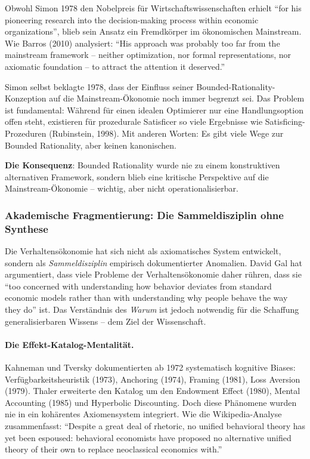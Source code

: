 Obwohl Simon 1978 den Nobelpreis für Wirtschaftswissenschaften erhielt ``for his pioneering research into the decision-making process within economic organizations'', blieb sein Ansatz ein Fremdkörper im ökonomischen Mainstream. Wie Barros (2010) analysiert: ``His approach was probably too far from the mainstream framework -- neither optimization, nor formal representations, nor axiomatic foundation -- to attract the attention it deserved.''

Simon selbst beklagte 1978, dass der Einfluss seiner Bounded-Rationality-Konzeption auf die Mainstream-Ökonomie noch immer begrenzt sei. Das Problem ist fundamental: Während für einen idealen Optimierer nur eine Handlungsoption offen steht, existieren für prozedurale Satisficer so viele Ergebnisse wie Satisficing-Prozeduren (Rubinstein, 1998). Mit anderen Worten: Es gibt viele Wege zur Bounded Rationality, aber keinen kanonischen.

\textbf{Die Konsequenz}: Bounded Rationality wurde nie zu einem konstruktiven alternativen Framework, sondern blieb eine kritische Perspektive auf die Mainstream-Ökonomie -- wichtig, aber nicht operationalisierbar.

\subsubsection{Akademische Fragmentierung: Die Sammeldisziplin ohne Synthese}

Die Verhaltensökonomie hat sich nicht als axiomatisches System entwickelt, sondern als \textit{Sammeldisziplin} empirisch dokumentierter Anomalien. David Gal hat argumentiert, dass viele Probleme der Verhaltensökonomie daher rühren, dass sie ``too concerned with understanding how behavior deviates from standard economic models rather than with understanding why people behave the way they do'' ist. Das Verständnis des \textit{Warum} ist jedoch notwendig für die Schaffung generalisierbaren Wissens -- dem Ziel der Wissenschaft.

\paragraph{Die Effekt-Katalog-Mentalität.}
Kahneman und Tversky dokumentierten ab 1972 systematisch kognitive Biases: Verfügbarkeitsheuristik (1973), Anchoring (1974), Framing (1981), Loss Aversion (1979). Thaler erweiterte den Katalog um den Endowment Effect (1980), Mental Accounting (1985) und Hyperbolic Discounting. Doch diese Phänomene wurden nie in ein kohärentes Axiomensystem integriert. Wie die Wikipedia-Analyse zusammenfasst: ``Despite a great deal of rhetoric, no unified behavioral theory has yet been espoused: behavioral economists have proposed no alternative unified theory of their own to replace neoclassical economics with.''

